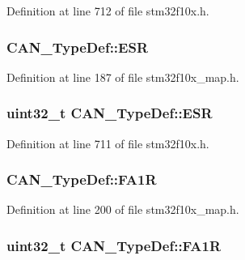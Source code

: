 Definition at line 712 of file stm32f10x.\+h.

\subsubsection[{\texorpdfstring{E\+SR}{ESR}}]{ C\+A\+N\+\_\+\+Type\+Def\+::\+E\+SR}\hypertarget{struct_c_a_n___type_def_acc1a4ec0a56a8fa3252682cad5009ccd}{}\label{struct_c_a_n___type_def_acc1a4ec0a56a8fa3252682cad5009ccd}


Definition at line 187 of file stm32f10x\+\_\+map.\+h.

\subsubsection[{\texorpdfstring{E\+SR}{ESR}}]{ {\bf uint32\+\_\+t} C\+A\+N\+\_\+\+Type\+Def\+::\+E\+SR}\hypertarget{struct_c_a_n___type_def_ab1a1b6a7c587443a03d654d3b9a94423}{}\label{struct_c_a_n___type_def_ab1a1b6a7c587443a03d654d3b9a94423}


Definition at line 711 of file stm32f10x.\+h.

\subsubsection[{\texorpdfstring{F\+A1R}{FA1R}}]{ C\+A\+N\+\_\+\+Type\+Def\+::\+F\+A1R}\hypertarget{struct_c_a_n___type_def_ab1c54aabfed1a9ec0c1ac057addb08a8}{}\label{struct_c_a_n___type_def_ab1c54aabfed1a9ec0c1ac057addb08a8}


Definition at line 200 of file stm32f10x\+\_\+map.\+h.

\subsubsection[{\texorpdfstring{F\+A1R}{FA1R}}]{ {\bf uint32\+\_\+t} C\+A\+N\+\_\+\+Type\+Def\+::\+F\+A1R}\hypertarget{struct_c_a_n___type_def_ab57a3a6c337a8c6c7cb39d0cefc2459a}{}\label{struct_c_a_n___type_def_ab57a3a6c337a8c6c7cb39d0cefc2459a}


